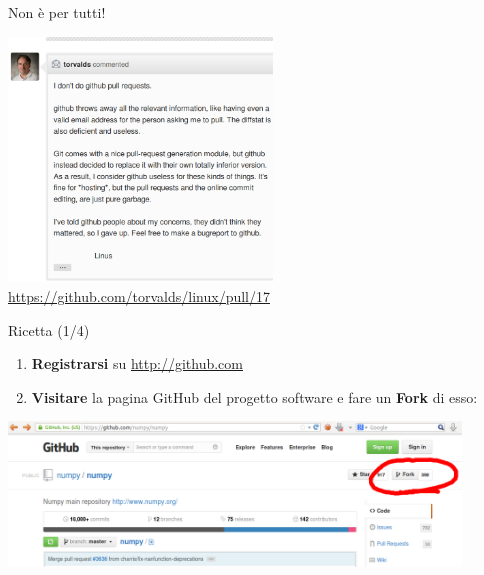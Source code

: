 \documentclass{beamer}
\begin{document}
\begin{frame}{\centerline{Non \`{e} per tutti!}}
\begin{center}
\includegraphics[width=7cm]{A2023.LavoroCondiviso/linus-on-pull-requests}
  \url{https://github.com/torvalds/linux/pull/17}
\end{center}
\end{frame}

\begin{frame}{\centerline{Ricetta (1/4)}}
  \begin{enumerate}
  \item \textbf{Registrarsi} su \url{http://github.com}
  \item \textbf{Visitare} la pagina GitHub del progetto software e fare un \textbf{Fork} di esso:
  \end{enumerate}
\begin{center}
\includegraphics[width=12cm]{A2023.LavoroCondiviso/github-fork}
\end{center}

\end{frame}
\end{document}
